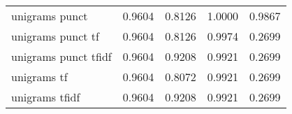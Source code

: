 \documentclass{article}
\begin{document}
\begin{table}
\begin{tabular}{lrrrr}
unigrams punct             & 0.9604 &       0.8126 &         1.0000 &               0.9867 \\
unigrams punct tf          & 0.9604 &       0.8126 &         0.9974 &               0.2699 \\
unigrams punct tfidf       & 0.9604 &       0.9208 &         0.9921 &               0.2699 \\
unigrams tf                & 0.9604 &       0.8072 &         0.9921 &               0.2699 \\
unigrams tfidf             & 0.9604 &       0.9208 &         0.9921 &               0.2699 \\
\bottomrule
\end{tabular}

\end{table}
\end{document}
